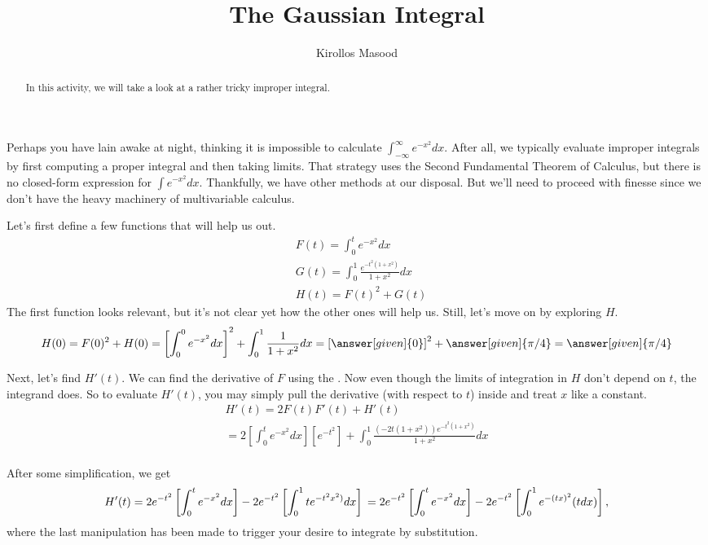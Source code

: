 \documentclass{ximera}
\title{The Gaussian Integral}
\author{Kirollos Masood}
\begin{document}
\begin{abstract}
In this activity, we will take a look at a rather tricky improper integral.
\end{abstract}
\maketitle

Perhaps you have lain awake at night, thinking it is impossible to calculate $\int_{-\infty}^{\infty} e^{-x^2}dx$. After all, we typically evaluate improper integrals by first computing a proper integral and then taking limits. That strategy uses the Second Fundamental Theorem of Calculus, but there is no closed-form expression for $\int e^{-x^2} dx$. Thankfully, we have other methods at our disposal. But we'll need to proceed with finesse since we don't have the heavy machinery of multivariable calculus.

Let's first define a few functions that will help us out.
\begin{align*}
	&F(t)=\int_{0}^{t} e^{-x^2}dx \\
	&G(t)=\int_{0}^{1} \frac{e^{-t^2(1+x^2)}}{1+x^2} dx \\
	&H(t)=F(t)^2+G(t)
\end{align*}
The first function looks relevant, but it's not clear yet how the other ones will help us. Still, let's move on by exploring $H$.
\begin{align*}
H(0)= F(0)^2+H(0)=\left[\int_{0}^{0} e^{-x^2}dx \right]^2+\int_{0}^{1} \frac{1}{1+x^2} dx =  \left[ \answer[given]{0} \right]^2 + \answer[given]{\pi/4} = \answer[given]{\pi/4}
\end{align*}

Next, let's find $H'(t)$. We can find the derivative of $F$ using the . Now even though the limits of integration in $H$ don't depend on $t$, the integrand does. So to evaluate $H'(t)$, you may simply pull the derivative (with respect to $t$) inside and treat $x$ like a constant.
\begin{align*}
H'(t) =2F(t)F'(t)+H'(t) \\
=2 \left[ \int_{0}^{t} e^{-x^2}dx \right] \left[ e^{-t^2} \right]+\int_{0}^{1} \frac{ (-2t(1+x^2)) e^{-t^2(1+x^2)}}{1+x^2} dx \\
\end{align*}

\begin{exercise}
	After some simplification, we get
	$$
	H'(t)= 2e^{-t^2} \left[ \int_{0}^{t} e^{-x^2}dx \right] -2e^{-t^2} \left[ \int_{0}^{1} t e^{-t^2 x^2)} dx \right] \\
	=2e^{-t^2} \left[ \int_{0}^{t} e^{-x^2}dx \right] -2e^{-t^2} \left[ \int_{0}^{1} e^{-(tx)^2} (tdx) \right],
	$$
	where the last manipulation has been made to trigger your desire to integrate by substitution.

\end{exercise}
\end{document}
